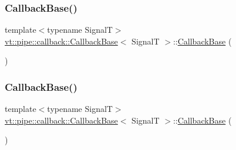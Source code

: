 \subsubsection{\texorpdfstring{Callback\+Base()}{CallbackBase()}\hspace{0.1cm}{\footnotesize\ttfamily [1/7]}}
{\footnotesize\ttfamily template$<$typename SignalT$>$ \\
\hyperlink{structvt_1_1pipe_1_1callback_1_1_callback_base}{vt\+::pipe\+::callback\+::\+Callback\+Base}$<$ SignalT $>$\+::\hyperlink{structvt_1_1pipe_1_1callback_1_1_callback_base}{Callback\+Base} (\begin{DoxyParamCaption}\item[{\hyperlink{structvt_1_1pipe_1_1callback_1_1_callback_base}{Callback\+Base}$<$ SignalT $>$ const \&}]{ }\end{DoxyParamCaption})\hspace{0.3cm}{\ttfamily [default]}}

\mbox{\label{structvt_1_1pipe_1_1callback_1_1_callback_base_aa90843711601bd1174ba64f69f754eb8}} 
\subsubsection{\texorpdfstring{Callback\+Base()}{CallbackBase()}\hspace{0.1cm}{\footnotesize\ttfamily [2/7]}}
{\footnotesize\ttfamily template$<$typename SignalT$>$ \\
\hyperlink{structvt_1_1pipe_1_1callback_1_1_callback_base}{vt\+::pipe\+::callback\+::\+Callback\+Base}$<$ SignalT $>$\+::\hyperlink{structvt_1_1pipe_1_1callback_1_1_callback_base}{Callback\+Base} (\begin{DoxyParamCaption}\item[{\hyperlink{structvt_1_1pipe_1_1callback_1_1_callback_base}{Callback\+Base}$<$ SignalT $>$ \&\&}]{ }\end{DoxyParamCaption})\hspace{0.3cm}{\ttfamily [default]}}

\mbox{\label{structvt_1_1pipe_1_1callback_1_1_callback_base_a683cee48109181768cd44354bc98e3e1}} 
